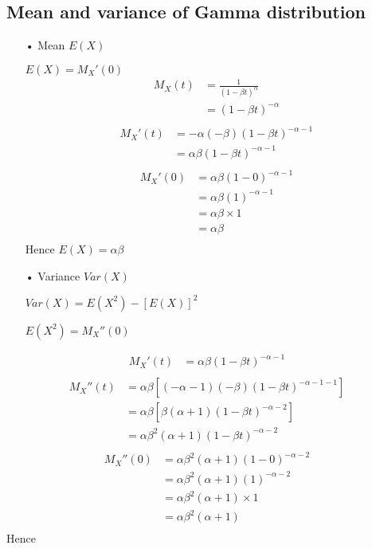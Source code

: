 \documentclass[11pt]{article}
\begin{document}
\subsection{Mean and variance of Gamma distribution}

\begin{itemize}
	\item[•]Mean $E(X)$
	
	
	$E(X)=M_X'(0)$
\begin{align*}
M_X(t)  
&=\frac{1}{(1-\beta t)^\alpha} \\
&=(1-\beta t)^{-\alpha} \\	
\end{align*}
\begin{align*}
M_X'(t)
&=-\alpha(-\beta)(1-\beta t)^{-\alpha-1} \\
&=\alpha \beta (1-\beta t)^{-\alpha-1} \\	
\end{align*}
\begin{align*}
M_X'(0)  
&=\alpha \beta (1-0)^{-\alpha-1} \\
&=\alpha \beta (1)^{-\alpha-1} \\
&=\alpha \beta \times 1 \\
&=\alpha \beta \\
\end{align*}
Hence $E(X)=\alpha \beta$
	
\item[•]Variance $Var(X)$
	
	$Var(X)=E(X^2)-[E(X)]^2$
	
	$E(X^2)=M_X''(0)$
\end{itemize}
\begin{align*}
	M_X'(t)  
	&=\alpha \beta (1-\beta t)^{-\alpha-1} \\
\end{align*}
\begin{align*}
M_X''(t)  
&=\alpha \beta[(-\alpha-1)(-\beta)(1-\beta t)^{-\alpha-1-1}]\\
&=\alpha \beta[\beta(\alpha+1)(1-\beta t)^{-\alpha-2}]\\
&=\alpha \beta ^2(\alpha+1)(1-\beta t)^{-\alpha-2}\\
\end{align*}
\begin{align*}
M_X''(0)  
&=\alpha \beta^2(\alpha+1)(1-0)^{-\alpha-2}\\&=\alpha \beta^2(\alpha+1)(1)^{-\alpha-2}\\
&=\alpha \beta^2(\alpha+1)\times 1\\
&=\alpha \beta^2(\alpha+1)\\
\end{align*}
Hence 
\end{document}
